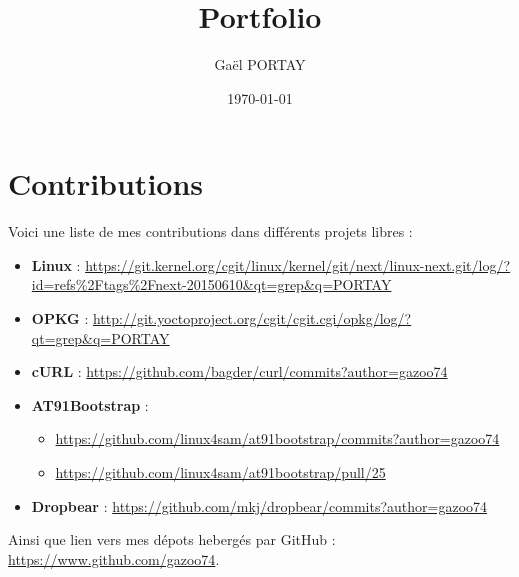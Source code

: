 \documentclass[a4paper]{article}
\title{Portfolio}
\author{Gaël PORTAY}
\date{\today}
\begin{document}
\maketitle

\begin{abstract}
\end{abstract}
\clearpage

\tableofcontents
\clearpage

\appendix
\section{Contributions}
Voici une liste de mes contributions dans différents projets libres :
\begin{itemize}
\item \textbf{Linux} : \url{https://git.kernel.org/cgit/linux/kernel/git/next/linux-next.git/log/?id=refs\%2Ftags\%2Fnext-20150610&qt=grep&q=PORTAY}
\item \textbf{OPKG} : \url{http://git.yoctoproject.org/cgit/cgit.cgi/opkg/log/?qt=grep&q=PORTAY}
\item \textbf{cURL} : \url{https://github.com/bagder/curl/commits?author=gazoo74}
\item \textbf{AT91Bootstrap} :
\begin{itemize}
\item \url{https://github.com/linux4sam/at91bootstrap/commits?author=gazoo74}
\item \url{https://github.com/linux4sam/at91bootstrap/pull/25}
\end{itemize}
\item \textbf{Dropbear} : \url{https://github.com/mkj/dropbear/commits?author=gazoo74}
\end{itemize}
Ainsi que lien vers mes dépots hebergés par GitHub : \url{https://www.github.com/gazoo74}.
\end{document}
